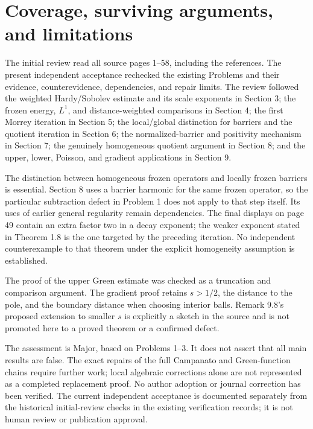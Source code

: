 \documentclass[10pt]{article}
\begin{document}
\section*{Coverage, surviving arguments, and limitations}
The initial review read all source pages 1–58, including the references. The present independent acceptance rechecked the existing Problems and their evidence, counterevidence, dependencies, and repair limits. The review followed the weighted Hardy/Sobolev estimate and its scale exponents in Section 3; the frozen energy, \(L^1\), and distance-weighted comparisons in Section 4; the first Morrey iteration in Section 5; the local/global distinction for barriers and the quotient iteration in Section 6; the normalized-barrier and positivity mechanism in Section 7; the genuinely homogeneous quotient argument in Section 8; and the upper, lower, Poisson, and gradient applications in Section 9.\par
The distinction between homogeneous frozen operators and locally frozen barriers is essential. Section 8 uses a barrier harmonic for the same frozen operator, so the particular subtraction defect in Problem 1 does not apply to that step itself. Its uses of earlier general regularity remain dependencies. The final displays on page 49 contain an extra factor two in a decay exponent; the weaker exponent stated in Theorem 1.8 is the one targeted by the preceding iteration. No independent counterexample to that theorem under the explicit homogeneity assumption is established.\par
The proof of the upper Green estimate was checked as a truncation and comparison argument. The gradient proof retains \(s>1/2\), the distance to the pole, and the boundary distance when choosing interior balls. Remark 9.8’s proposed extension to smaller \(s\) is explicitly a sketch in the source and is not promoted here to a proved theorem or a confirmed defect.\par
The assessment is Major, based on Problems 1–3. It does not assert that all main results are false. The exact repairs of the full Campanato and Green-function chains require further work; local algebraic corrections alone are not represented as a completed replacement proof. No author adoption or journal correction has been verified. The current independent acceptance is documented separately from the historical initial-review checks in the existing verification records; it is not human review or publication approval.\par
\end{document}
